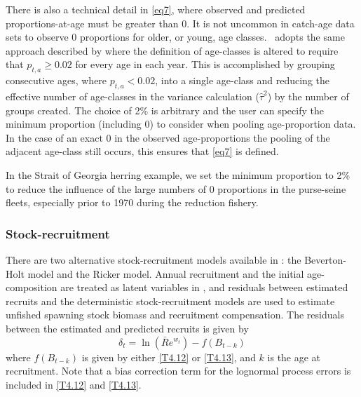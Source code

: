 There is also a technical detail in \eqref{eq7}, where observed and predicted proportions-at-age must be greater than 0.  It is not uncommon in catch-age data sets to observe 0 proportions for older, or young, age classes.  \iscam\ adopts the same approach described by \cite{richards1997visualizing} where the definition of age-classes is altered to require that $p_{t,a}\geq 0.02$ for every age in each year.  This is accomplished by grouping consecutive ages, where $p_{t,a} <0.02$, into a single age-class and reducing the effective number of age-classes in the variance calculation ($\widehat{\tau}^2$) by the number of groups created.  The choice of 2\% is arbitrary and the user can specify the minimum proportion (including 0) to consider when pooling age-proportion data.  In the case of an exact 0 in the observed age-proportions the pooling of the adjacent age-class still occurs, this ensures that \eqref{eq7} is defined.

In the Strait of Georgia herring example, we set the minimum proportion to 2\% to reduce the influence of the large numbers of 0 proportions in the purse-seine fleets, especially prior to 1970 during the reduction fishery.


\subsubsection{Stock-recruitment}
There are two alternative stock-recruitment models available in \iscam: the Beverton-Holt model and the Ricker model.  Annual recruitment and the initial age-composition are treated as latent variables in \iscam, and residuals between estimated recruits and the deterministic stock-recruitment models are used to estimate unfished spawning stock biomass and recruitment compensation.  The residuals between the estimated and predicted recruits is given by
\begin{equation}\label{eq9}
	\delta_t = \ln(\bar{R}e^{w_t}) - f(B_{t-k})
\end{equation}
where $f(B_{t-k})$ is given by either \eqref{T4.12} or \eqref{T4.13}, and $k$ is the age at recruitment.  Note that a bias correction term for the lognormal process  errors is included in  \eqref{T4.12} and \eqref{T4.13}.

